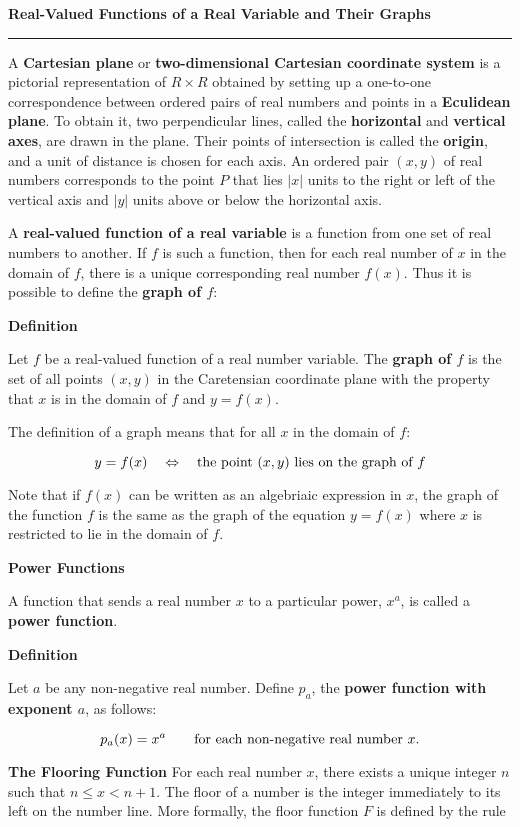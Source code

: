 {\bf Real-Valued Functions of a Real Variable and Their Graphs}
\vskip 1mm
\hrule

\vskip 1cm
A {\bf Cartesian plane} or {\bf two-dimensional Cartesian coordinate system} is a pictorial representation of $R\times R$ obtained by setting up a one-to-one correspondence between ordered pairs of real numbers and points in a {\bf Eculidean plane}. To obtain it, two perpendicular lines, called the {\bf horizontal} and {\bf vertical axes}, are drawn in the plane. Their points of intersection is called the {\bf origin}, and a unit of distance is chosen for each axis. An ordered pair $(x,y)$ of real numbers corresponds to the point $P$ that lies $|x|$ units to the right or left of the vertical axis and $|y|$ units above or below the horizontal axis.

\vskip 1mm
A {\bf real-valued function of a real variable} is a function from one set of real numbers to another. If $f$ is such a function, then for each real number of $x$ in the domain of $f$, there is a unique corresponding real number $f(x)$. Thus it is possible to define the {\bf graph of $f$}:

\vskip 3mm
{\bf Definition}

\vskip 1mm
Let $f$ be a real-valued function of a real number variable. The {\bf graph of $f$} is the set of all points $(x,y)$ in the Caretensian coordinate plane with the property that $x$ is in the domain of $f$ and $y=f(x)$.

\vskip 1mm
The definition of a graph means that for all $x$ in the domain of $f$:

$$y=f(x)\quad\Leftrightarrow\quad\hbox{the point $(x,y)$ lies on the graph of $f$}$$

Note that if $f(x)$ can be written as an algebriaic expression in $x$, the graph of the function $f$ is the same as the graph of the equation $y=f(x)$ where $x$ is restricted to lie in the domain of $f$.

\filbreak
\vskip 3mm
{\bf Power Functions}

\vskip 1mm
A function that sends a real number $x$ to a particular power, $x^a$, is called a {\bf power function}.

\vskip 3mm
{\bf Definition}

\vskip 1mm
Let $a$ be any non-negative real number. Define $p_a$, the {\bf power function with exponent $a$}, as follows:

$$p_a(x)=x^a\qquad\hbox{for each non-negative real number $x$.}$$

\filbreak
\vskip 1cm
{\bf The Flooring Function}
For each real number $x$, there exists a unique integer $n$ such that $n\leq x < n+1$. The floor of a number is the integer immediately to its left on the number line. More formally, the floor function $F$ is defined by the rule

